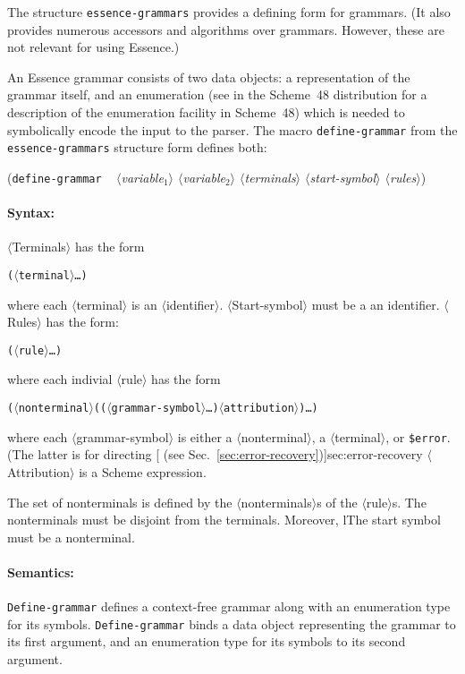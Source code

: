 \documentclass{article}
\newcommand{\meta}[1]{{\noindent\mbox{\textrm{$\langle$#1$\rangle$}}}}
\newcommand{\pproto}[2]{\unskip%
\mbox{\texonly{\spaceskip=0.5em}#1}%
\mbox{ }\texonly{\nobreak}\htmlonly{ }\textrm{#2}}
\newcommand{\proto}[3]{\par\bigskip\begin{flushleft}\pproto{(\texttt{#1}}{\textit{#2})}\hspace*{\fill}{#3}\end{flushleft}}
\newcommand{\dotsfoo}{\ldots\texonly{\thinspace}}
\newcommand{\codefont}[1]{\texttt{#1}}
\begin{document}
The structure \codefont{essence-grammars} provides a defining form for
grammars.  (It also provides numerous accessors and algorithms over
grammars.  However, these are not relevant for using Essence.)

An Essence grammar consists of two data objects: a representation of
the grammar itself, and an enumeration (see 
in the Scheme~48 distribution for a description of the enumeration
facility in Scheme~48) which is needed to symbolically encode the
input to the parser.  The macro \codefont{define-grammar} from the
\codefont{essence-grammars} structure form defines both:

\label{form:define-grammar}
\proto{define-grammar}{ \meta{variable$_1$} \meta{variable$_2$}\hfill\linebreak\texonly{\hspace*{1em}}
    \meta{terminals}
  \meta{start-symbol} \meta{rules}}{syntax}

\paragraph{Syntax:} \meta{Terminals} has the form
%
\begin{alltt}
  (\meta{terminal} \dotsfoo)
\end{alltt}
%
where each \meta{terminal} is an \meta{identifier}.  
\meta{Start-symbol} must
be a an identifier.  \meta{Rules} has the form:
%
\begin{alltt}
  (\meta{rule} \dotsfoo)
\end{alltt}
%
where each indivial \meta{rule} has the form
%
\begin{alltt}
  (\meta{nonterminal} ((\meta{grammar-symbol} \dotsfoo) \meta{attribution}) \dotsfoo)
\end{alltt}
%
where each \meta{grammar-symbol} is either a \meta{nonterminal}, a
\meta{terminal}, or \codefont{\$error}.  (The latter is for directing
[ (see
Sec.~\ref{sec:error-recovery})]{sec:error-recovery} \meta{Attribution}
is a Scheme expression.

The set of nonterminals is defined by the \meta{nonterminals}s of the
\meta{rule}s.  The nonterminals must be disjoint from the terminals.
Moreover, lThe start symbol must be a nonterminal.

\paragraph{Semantics:} \codefont{Define-grammar} defines a
context-free grammar along with an enumeration type for its symbols.
\codefont{Define-grammar} binds a data object representing the grammar 
to its first argument, and an enumeration type for its symbols to its
second argument.
\end{document}
